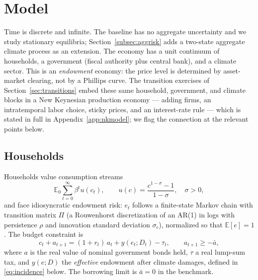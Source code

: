 \documentclass[12pt]{article}
\newcommand{\E}{\mathbb{E}}
\begin{document}
\section{Model}\label{sec:model}

Time is discrete and infinite. The baseline has no aggregate uncertainty
and we study stationary equilibria; Section~\ref{subsec:aggrisk} adds a
two-state aggregate climate process as an extension. The economy has a
unit continuum of households, a government (fiscal authority plus central
bank), and a climate sector. This is an \emph{endowment} economy: the price
level is determined by asset-market clearing, not by a Phillips curve. The
transition exercises of Section~\ref{sec:transitions} embed these same
household, government, and climate blocks in a New Keynesian production
economy --- adding firms, an intratemporal labor choice, sticky prices, and
an interest-rate rule --- which is stated in full in
Appendix~\ref{app:nkmodel}; we flag the connection at the relevant points
below.

\subsection{Households}\label{subsec:households}

Households value consumption streams
\begin{equation}
\E_0 \sum_{t=0}^{\infty}\beta^t u(c_t), \qquad
u(c)=\frac{c^{1-\sigma}-1}{1-\sigma},\quad \sigma>0,
\label{eq:preferences}
\end{equation}
and face idiosyncratic endowment risk: $e_t$ follows a finite-state Markov
chain with transition matrix $\Pi$ (a Rouwenhorst discretization of an AR(1)
in logs with persistence $\rho$ and innovation standard deviation
$\sigma_\epsilon$), normalized so that $\E[e]=1$. The budget constraint is
\begin{equation}
c_t + a_{t+1} = (1+r_t)\,a_t + y(e_t; D_t) - \tau_t,
\qquad a_{t+1}\ge -\bar a,
\label{eq:budget}
\end{equation}
where $a$ is the real value of nominal government bonds held, $\tau$ a real
lump-sum tax, and $y(e;D)$ the \emph{effective} endowment after climate
damages, defined in \eqref{eq:incidence} below. The borrowing limit is
$\bar a = 0$ in the benchmark.
\end{document}

